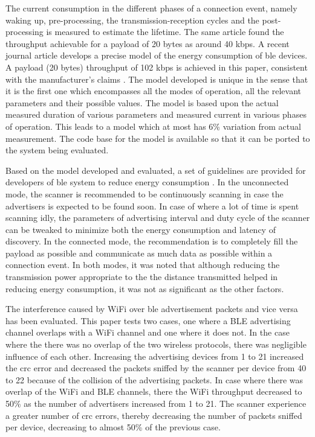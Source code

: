The current consumption in the different phases of a connection event, namely waking up, pre-processing, the transmission-reception cycles and the post-processing is measured \cite{Mackensen2012} to estimate the lifetime. The same article found the throughput achievable for a payload of 20 bytes as around 40 kbps. A recent journal article \cite{Kindt2014} develops a precise model of the energy consumption of \gls{ble} devices. A payload (20 bytes) throughput of 102 kbps is achieved in this paper, consistent with the manufacturer's claims \cite{MikkoSavolainen}. The model developed is  unique in the sense that it is the first one which encompasses all the modes of operation, all the relevant parameters and their possible values. The model is based upon the actual measured duration of various parameters and measured current in various phases of operation. This leads to a model which at most has 6\% variation from actual measurement. The code base for the model is available so that it can be ported to the system being evaluated.

Based on the model developed and evaluated, a set of guidelines are provided for developers of \gls{ble} system to reduce energy consumption \cite{Kindt2014}. In the unconnected mode, the scanner is recommended to be continuously scanning in case the advertisers is expected to be found soon. In case of where a lot of time is spent scanning idly, the parameters of advertising interval and duty cycle of the scanner can be tweaked to minimize both the energy consumption and latency of discovery. In the connected mode, the recommendation is to completely fill the payload as possible and communicate as much data as possible within a connection event. In both modes, it was noted that although reducing the transmission power appropriate to the the distance transmitted helped in reducing energy consumption, it was not as significant as the other factors.

The interference caused by WiFi over \gls{ble} advertisement packets and vice versa has been evaluated\cite{Wyffels}. This paper tests two cases, one where a BLE advertising channel overlaps with a WiFi channel and one where it does not. In the case where the there was no overlap of the two wireless protocols, there was negligible influence of each other. Increasing the advertising devices from 1 to 21 increased the \gls{crc} error and decreased the packets sniffed by the scanner per device from 40 to 22 because of the collision of the advertising packets. In case where there was overlap of the WiFi and BLE channels, there the WiFi throughput decreased to 50\% as the number of advertisers increased from 1 to 21. The scanner experience a greater number of \gls{crc} errors, thereby decreasing the number of packets sniffed per device, decreasing to almost 50\% of the previous case.

